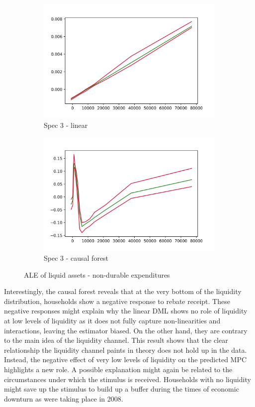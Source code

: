 \begin{figure}[t]
    \centering
    \begin{subfigure}{0.5\textwidth}
        \includegraphics[width=\textwidth]{figures/ALE/chNDexp/spec3_linear_liqassii.png}
        \caption{Spec 3 - linear}
    \end{subfigure}%
    \begin{subfigure}{0.5\textwidth}
        \includegraphics[width=\textwidth]{figures/ALE/chNDexp/spec3_cf_liqassii.png}
        \caption{Spec 3 - causal forest}
    \end{subfigure}
    \caption{ALE of liquid assets - non-durable expenditures}
\end{figure}
Interestingly, the causal forest reveals that at the very bottom of the liquidity distribution, households show a negative response to rebate receipt. These negative responses might explain why the linear DML shows no role of liquidity at low levels of liquidity as it does not fully capture non-linearities and interactions, leaving the estimator biased. On the other hand, they are contrary to the main idea of the liquidity channel. This result shows that the clear relationship the liquidity channel paints in theory does not hold up in the data. Instead, the negative effect of very low levels of liquidity on the predicted MPC highlights a new role. A possible explanation might again be related to the circumstances under which the stimulus is received. Households with no liquidity might save up the stimulus to build up a buffer during the times of economic downturn as were taking place in 2008. \\
